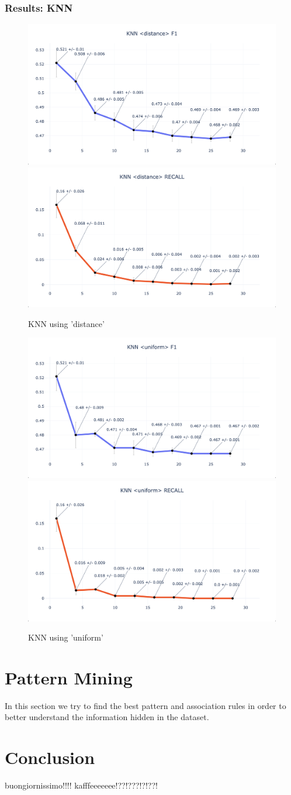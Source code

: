 \documentclass{article}
\begin{document}
	\subsubsection{Results: KNN}
	
	\begin{figure}[H]
		\centering
		\includegraphics[width=.49\textwidth]{clf_img/knn_d_f1.png}
		\includegraphics[width=.49\textwidth]{clf_img/knn_d_recall.png}
		\caption{KNN using 'distance'}
		\label{fig:hyper_knn1}
	\end{figure}
	
	\begin{figure}[H]
		\centering
		\includegraphics[width=.49\textwidth]{clf_img/knn_u_f1.png}
		\includegraphics[width=.49\textwidth]{clf_img/knn_u_recall.png}
		\caption{KNN using 'uniform'}
		\label{fig:hyper_knn2}
	\end{figure}
	
	
	\section{Pattern Mining}
	\label{sec:patternmining}
	In this section we try to find the best pattern and association rules in order to better understand the information hidden in the dataset. 
	
	\section{Conclusion}
	buongiornissimo!!!! kafffeeeeeee!??!???!?!??!
	
	
\end{document}

